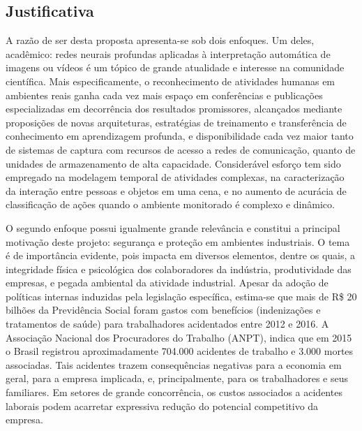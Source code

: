 
\subsection{Justificativa}
\label{ssec:just}
A razão de ser desta proposta apresenta-se sob dois enfoques. Um deles, acadêmico: redes neurais profundas aplicadas à interpretação automática de imagens ou vídeos é um tópico de grande atualidade e interesse na comunidade científica. Mais especificamente, o reconhecimento de atividades humanas em ambientes reais ganha cada vez mais espaço em conferências e publicações especializadas em decorrência dos resultados promissores, alcançados mediante proposições de novas arquiteturas, estratégias de treinamento e transferência de conhecimento em aprendizagem profunda, e disponibilidade cada vez maior tanto de sistemas de captura com recursos de acesso a redes de comunicação, quanto de unidades de armazenamento de alta capacidade. Considerável esforço tem sido empregado na modelagem temporal de atividades complexas, na caracterização da interação entre pessoas e objetos em uma cena, e no aumento de acurácia de classificação de ações quando o ambiente monitorado é complexo e dinâmico.

O segundo enfoque possui igualmente grande relevância e constitui a principal motivação deste projeto: segurança e proteção em ambientes industriais. O tema é de importância evidente, pois impacta em diversos elementos, dentre os quais, a integridade física e psicológica dos colaboradores da indústria, produtividade das empresas, e pegada ambiental da atividade industrial. Apesar da adoção de políticas internas induzidas pela legislação específica, estima-se que mais de R\$ 20 bilhões da Previdência Social foram gastos com benefícios (indenizações e tratamentos de saúde) para trabalhadores acidentados entre 2012 e 2016. A Associação Nacional dos Procuradores do Trabalho (ANPT), indica que em 2015 o Brasil registrou aproximadamente 704.000 acidentes de trabalho e 3.000 mortes associadas. Tais acidentes trazem consequências negativas para a economia em geral, para a empresa implicada, e, principalmente, para os trabalhadores e seus familiares. Em setores de grande concorrência, os custos associados a acidentes laborais podem acarretar expressiva redução do potencial competitivo da empresa.  

